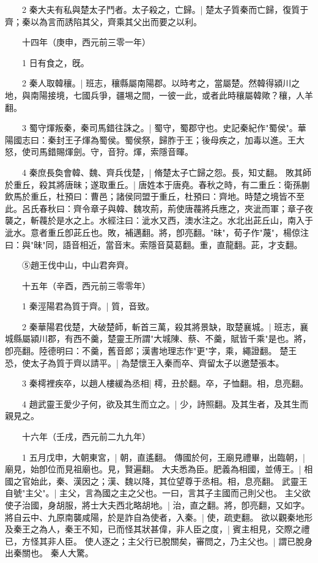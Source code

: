 　　2 秦大夫有私與楚太子鬥者。太子殺之，亡歸。|{
	楚太子質秦而亡歸，復質于齊；秦以為言而誘陷其父，齊乘其父出而要之以利。
	}

　　十四年（庚申，西元前三零一年）

　　1 日有食之，旣。

　　2 秦人取韓穰。|{
	班志，穰縣屬南陽郡。以時考之，當屬楚。然韓得潁川之地，與南陽接境，七國兵爭，疆埸之間，一彼一此，或者此時穰屬韓歟？穰，人羊翻。
	}

　　3 蜀守煇叛秦，秦司馬錯往誅之。|{
	蜀守，蜀郡守也。史記秦紀作"蜀侯"。華陽國志曰：秦封王子煇為蜀侯。蜀侯祭，歸胙于王；後母疾之，加毒以進。王大怒，使司馬錯賜煇劍。守，音狩。煇，索隱音暉。
	}

　　4 秦庶長奐會韓、魏、齊兵伐楚，|{
	脩楚太子亡歸之怨。長，知丈翻。
	}
敗其師於重丘，殺其將唐昧；遂取重丘。|{
	唐姓本于唐堯。春秋之時，有二重丘：衛孫蒯飲馬於重丘，杜預曰：曹邑；諸侯同盟于重丘，杜預曰：齊地。時楚之境皆不至此。呂氏春秋曰：齊令章子與韓、魏攻荊，荊使唐薎將兵應之，夾泚而軍；章子夜襲之，斬薎於是水之上。水經注曰：泚水又西，澳水注之。水北出茈丘山，南入于泚水。意者重丘卽茈丘也。敗，補邁翻。將，卽亮翻。"昧"，荀子作"蔑"，楊倞注曰：與"昧"同，語音相近，當音末。索隱音莫葛翻。重，直龍翻。茈，才支翻。
	}

　　⑤趙王伐中山，中山君奔齊。

　　十五年（辛酉，西元前三零零年）

　　1 秦涇陽君為質于齊。|{
	質，音致。
	}

　　2 秦華陽君伐楚，大破楚師，斬首三萬，殺其將景缺，取楚襄城。|{
	班志，襄城縣屬潁川郡，有西不羹，楚靈王所謂"大城陳、蔡、不羹，賦皆千乘"是也。將，卽亮翻。陸德明曰：不羹，舊音郎；漢書地理志作"更"字，乘，繩證翻。
	}
楚王恐，使太子為質于齊以請平。|{
	為楚懷王入秦而卒、齊留太子以邀楚張本。
	}

　　3 秦樗裡疾卒，以趙人樓緩為丞相|{
	樗，丑於翻。卒，子恤翻。相，息亮翻。
	}

　　4 趙武靈王愛少子何，欲及其生而立之。|{
	少，詩照翻。及其生者，及其生而親見之。
	}

　　十六年（壬戌，西元前二九九年）

　　1 五月戊申，大朝東宮，|{
	朝，直遙翻。
	}
傳國於何，王廟見禮畢，出臨朝，|{
	廟見，始卽位而見祖廟也。見，賢遍翻。
	}
大夫悉為臣。肥義為相國，並傅王。|{
	相國之官始此，秦、漢因之；漢、魏以降，其位望尊于丞相。相，息亮翻。
	}
武靈王自號"主父"。|{
	主父，言為國之主之父也。一曰，言其子主國而己則父也。
	}
主父欲使子治國，身胡服，將士大夫西北略胡地。|{
	治，直之翻。將，卽亮翻，又如字。
	}
將自云中、九原南襲咸陽，於是詐自為使者，入秦。|{
	使，疏吏翻。
	}
欲以觀秦地形及秦王之為人，秦王不知，已而怪其狀甚偉，非人臣之度，|{
	賓主相見，交際之禮已，方怪其非人臣。
	}
使人逐之；主父行已脫關矣，審問之，乃主父也。|{
	謂已脫身出秦關也。
	}
秦人大驚。

